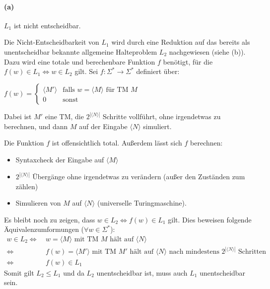 
 
\paragraph{(a)}
	$L_{1}$ ist nicht entscheidbar.

	Die Nicht-Entscheidbarkeit von $L_1$ wird durch eine Reduktion auf das bereits als unentscheidbar bekannte allgemeine Halteproblem $L_2$ nachgewiesen (siehe (b)). Dazu wird eine totale und berechenbare Funktion $f$ benötigt, für die $f(w) \in L_1 \Leftrightarrow w \in L_2$ gilt. Sei $f:\Sigma^*\rightarrow \Sigma^*$ definiert über:

	$f(w)=\begin{cases}
		\langle M' \rangle &\text{falls $w=\langle M \rangle$ für TM $M$}\\
		0 &\text{sonst}
	\end{cases}$

	Dabei ist $M'$ eine TM, die $2^{|\langle N \rangle|}$ Schritte vollführt, ohne irgendetwas zu berechnen, und dann $M$ auf der Eingabe $\langle N \rangle$ simuliert.
	
	Die Funktion $f$ ist offensichtlich total. Außerdem lässt sich $f$ berechnen:
	\begin{itemize}
		\item Syntaxcheck der Eingabe auf $\langle M \rangle$
		\item $2^{|\langle N \rangle|}$ Übergänge ohne irgendetwas zu verändern (außer den Zuständen zum zählen)
		\item Simulieren von $M$ auf $\langle N \rangle$ (universelle Turingmaschine).
	\end{itemize}

	Es bleibt noch zu zeigen, dass $w \in L_2 \Leftrightarrow f(w) \in L_1$ gilt. Dies beweisen folgende Äquivalenzumformungen ($\forall w \in \Sigma^*$):
	\begin{align*}
		w \in L_2 \Longleftrightarrow\ &w = \langle M \rangle \text{ mit TM } M \text{ hält auf } \langle N \rangle \\
		\Leftrightarrow\ &f(w) = \langle M' \rangle \text{ mit TM } M' \text{ hält auf } \langle N \rangle \text{ nach mindestens } 2^{|\langle N \rangle|} \text{ Schritten}\\
		\Leftrightarrow\ &f(w) \in L_1
	\end{align*}
	Somit gilt $L_2 \leq L_1$ und da $L_2$ unentscheidbar ist, muss auch $L_1$ unentscheidbar sein.
	

